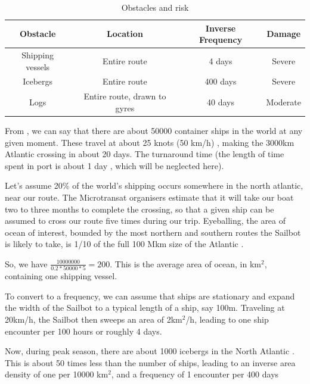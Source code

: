 \begin{table}[h]
\caption{\label{tab:obstacles}Obstacles and risk}
\begin{tabular}{c|c|c|c}

Obstacle & Location & Inverse Frequency & Damage\\[0.6cm]
\hline

Shipping vessels & Entire route & 4 days & Severe \\
Icebergs & Entire route & 400 days & Severe \\
Logs & Entire route, drawn to gyres & 40 days & Moderate \\

\end{tabular}
\end{table}

From \cite{jallal__how-many-ships}, we can say that there are about 50000 container ships in the world at any given moment. These travel at about 25 knots (50 km/h) \cite{maersk__triple-e-class}, making the 3000km Atlantic crossing in about 20 days. The turnaround time (the length of time spent in port is about 1 day \cite{port-technology__global-turnaround-times}, which will be neglected here).

Let's assume 20\% of the world's shipping occurs somewhere in the north atlantic, near our route. The Microtransat organisers estimate that it will take our boat two to three months to complete the crossing, so that a given ship can be assumed to cross our route five times during our trip. Eyeballing, the area of ocean of interest, bounded by the most northern and southern routes the Sailbot is likely to take, is 1/10 of the full 100 Mkm size of the Atlantic \cite{worldatlas__atlantic-ocean}.

So, we have $\frac{10000000}{0.2*50000*5}=200$. This is the average area of ocean, in km$^2$, containing one shipping vessel.

To convert to a frequency, we can assume that ships are stationary and expand the width of the Sailbot to a typical length of a ship, say 100m. Traveling at 20km/h, the Sailbot then sweeps an area of 2km$^2$/h, leading to one ship encounter per 100 hours or roughly 4 days.

Now, during peak season, there are about 1000 icebergs in the North Atlantic \cite{natgeo__iceberg-frequency}. This is about 50 times less than the number of ships, leading to an inverse area density of one per 10000 km$^2$, and a frequency of 1 encounter per 400 days


\clearpage
\newpage
